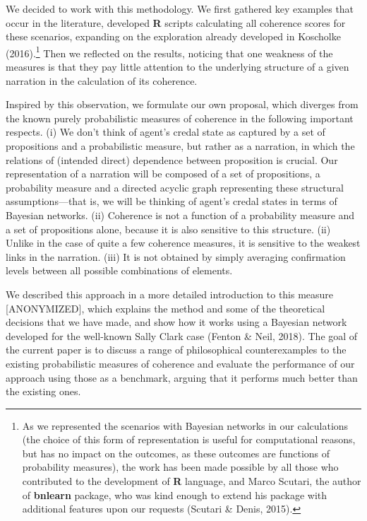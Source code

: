 \documentclass[
  10pt,
]{scrartcl}
\begin{document}
We decided to work with this methodology. We first gathered key examples that occur in the literature, developed \textbf{\textsf{R}} scripts calculating all coherence scores for these scenarios, expanding on the exploration already developed in Koscholke (2016).\footnote{
  As we represented the scenarios with Bayesian networks in our calculations (the choice of this form of representation is useful for computational reasons, but has no impact on the outcomes, as these outcomes are functions of probability measures), the work has been made possible by all those who contributed to the development of \textsf{\textbf{R}} language, and Marco Scutari, the author of \textsf{\textbf{bnlearn}} package, who was kind enough to extend his package with additional features upon our requests (Scutari \& Denis, 2015).} Then we reflected on the results, noticing that one weakness of the measures is that they pay little attention to the underlying structure of a given narration in the calculation of its coherence.

Inspired by this observation, we formulate our own proposal, which diverges from the known purely probabilistic measures of coherence in the following important respects. (i) We don't think of agent's credal state as captured by a set of propositions and a probabilistic measure, but rather as a narration, in which the relations of (intended direct) dependence between proposition is crucial. Our representation of a narration will be composed of a set of propositions, a probability measure and a directed acyclic graph representing these structural assumptions---that is, we will be thinking of agent's credal states in terms of Bayesian networks. (ii) Coherence is not a function of a probability measure and a set of propositions alone, because it is also sensitive to this structure. (ii) Unlike in the case of quite a few coherence measures, it is sensitive to the weakest links in the narration. (iii) It is not obtained by simply averaging confirmation levels between all possible combinations of elements.

We described this approach in a more detailed introduction to this measure {[}ANONYMIZED{]}, which explains the method and some of the theoretical decisions that we have made, and show how it works using a Bayesian network developed for the well-known Sally Clark case (Fenton \& Neil, 2018). The goal of the current paper is to discuss a range of philosophical counterexamples to the existing probabilistic measures of coherence and evaluate the performance of our approach using those as a benchmark, arguing that it performs much better than the existing ones.
\end{document}
